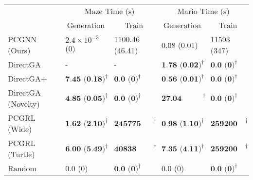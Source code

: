 \begin{tabular}{lllll}
\toprule
{} & \multicolumn{2}{c}{Maze Time (s)} & \multicolumn{2}{c}{Mario Time (s)} \\
{} & \multicolumn{1}{c}{Generation} & \multicolumn{1}{c}{Train} & \multicolumn{1}{c}{Generation} & \multicolumn{1}{c}{Train  }\\
\midrule
PCGNN (Ours)       &          $2.4 \times 10^{-3}$ (0) &                     1100.46 (46.41) &                        0.08 (0.01) &                      11593 (347) \\
DirectGA           &                                 - &                                   - &   $\textbf{1.78 (0.02)}^{\dagger}$ &     $\textbf{0.0 (0)}^{\dagger}$ \\
DirectGA+          &  $\textbf{7.45 (0.18)}^{\dagger}$ &        $\textbf{0.0 (0)}^{\dagger}$ &   $\textbf{0.56 (0.01)}^{\dagger}$ &     $\textbf{0.0 (0)}^{\dagger}$ \\
DirectGA (Novelty) &  $\textbf{4.85 (0.05)}^{\dagger}$ &        $\textbf{0.0 (0)}^{\dagger}$ &  $\textbf{27.04 (0.49)}^{\dagger}$ &     $\textbf{0.0 (0)}^{\dagger}$ \\
PCGRL (Wide)       &  $\textbf{1.62 (2.10)}^{\dagger}$ &  $\textbf{245775 (6246)}^{\dagger}$ &   $\textbf{0.98 (1.10)}^{\dagger}$ &  $\textbf{259200 (0)}^{\dagger}$ \\
PCGRL (Turtle)     &  $\textbf{6.00 (5.49)}^{\dagger}$ &    $\textbf{40838 (496)}^{\dagger}$ &   $\textbf{7.35 (4.11)}^{\dagger}$ &  $\textbf{259200 (0)}^{\dagger}$ \\
Random             &                           0.0 (0) &        $\textbf{0.0 (0)}^{\dagger}$ &                            0.0 (0) &     $\textbf{0.0 (0)}^{\dagger}$ \\
\bottomrule
\end{tabular}

